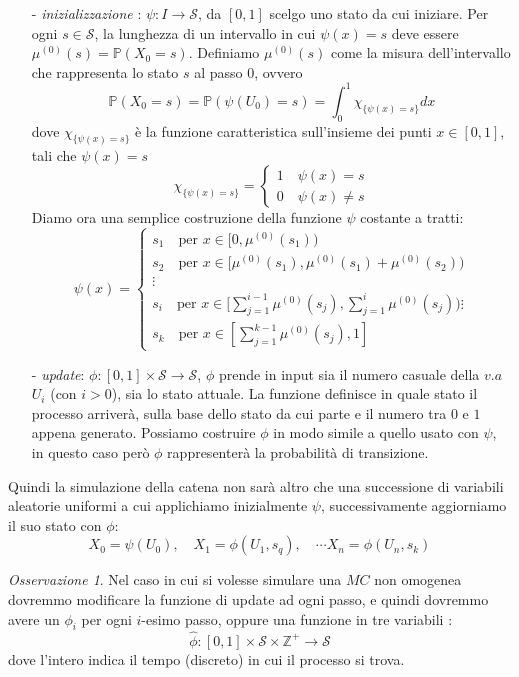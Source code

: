 \documentclass{article}
\theoremstyle{definition}
\theoremstyle{definition}
\theoremstyle{remark}
\newtheorem{remark}[theorem]{Osservazione}
\begin{document}
\begin{itemize}
    \item[-] \textit{inizializzazione} : $\psi : I\to \mathcal{S}$, da $[0,1]$ scelgo uno stato da cui iniziare.
          Per ogni $s\in\mathcal{S}$, la lunghezza di un intervallo in cui $\psi(x)=s$ deve essere $\mu^{(0)}(s) =\mathbb{P}(X_0 = s) $.
          Definiamo $\mu^{(0)}(s)$ come la misura dell'intervallo che rappresenta lo stato $s$ al passo $0$, ovvero
          $$ \mathbb{P}(X_0 = s) = \mathbb{P}(\psi(U_0)=s) = \int_0^1 \chi_{\{\psi(x)=s\}} dx$$
          dove $\chi_{\{\psi(x) = s\}}$ è la funzione caratteristica sull'insieme dei punti  $x\in [0,1]$, tali che $\psi(x) = s$
          $$\chi_{\{\psi(x) = s\}} =\left\{ \begin{array}{cl} 1 \quad \psi(x) = s\\ 0 \quad \psi(x) \neq s\end{array} \right.$$
          Diamo ora una semplice costruzione della funzione $\psi$ costante a tratti:
          $$\psi(x)= \begin{cases}

                  s_1 \quad \text{per $x\in [0,\mu^{(0)}(s_1))$}                             \\
                  s_2 \quad \text{per $x\in [\mu^{(0)}(s_1),\mu^{(0)}(s_1)+\mu^{(0)}(s_2))$} \\
                  \vdots                                                                     \\
                  s_i \quad \text{per $x \in [\sum_{j=1}^{i-1}\mu^{(0)}(s_j),\sum_{j=1}^i\mu^{(0)}(s_j))$}
                  \vdots                                                                     \\
                  s_k \quad \text{per $x\in[\sum_{j=1}^{k-1}\mu^{(0)}(s_j),1]$}
              \end{cases}$$
    \item[-]\textit{update}: $\phi : [0,1]\times\mathcal{S}\to \mathcal{S} $, $\phi$ prende in input sia il numero casuale della $v.a$ $U_i$ (con $i>0$), sia  lo stato attuale.
          La funzione definisce in quale stato il processo arriverà, sulla base dello stato da cui parte e il numero tra $0$ e $1$ appena generato. Possiamo costruire $\phi$ in modo simile
          a quello usato con $\psi$, in questo caso però $\phi$ rappresenterà la probabilità di transizione.
\end{itemize}
Quindi la simulazione della catena non sarà altro che una successione di variabili aleatorie uniformi a cui applichiamo inizialmente $\psi$, successivamente aggiorniamo
il suo stato con $\phi$:
$$X_0 = \psi(U_0),\quad X_1 = \phi(U_1,s_q),\quad  \cdots X_n = \phi(U_n,s_k)$$
\begin{remark}
    Nel caso in cui si volesse simulare una $MC$ non omogenea  dovremmo modificare la funzione di update ad ogni passo, e quindi dovremmo avere un $\phi_i$ per ogni $i$-esimo passo, oppure  una funzione in tre variabili :
    $$\widehat{\phi}:[0,1]\times\mathcal{S}\times \mathbb{Z}^+\to \mathcal{S}$$
    dove l'intero indica il tempo (discreto) in cui il processo si trova.
\end{remark}
\end{document}
